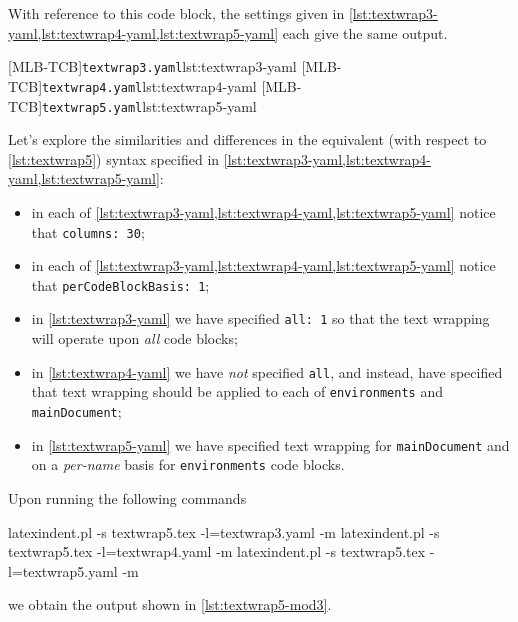 	With reference to this code block, the settings given in
	\cref{lst:textwrap3-yaml,lst:textwrap4-yaml,lst:textwrap5-yaml} each give the same
	output.

	\begin{cmhtcbraster}[raster columns=3,
			raster left skip=-3.5cm,
			raster right skip=-2cm,
			raster column skip=.03\linewidth]
		[MLB-TCB]{\texttt{textwrap3.yaml}}{lst:textwrap3-yaml}
		[MLB-TCB]{\texttt{textwrap4.yaml}}{lst:textwrap4-yaml}
		[MLB-TCB]{\texttt{textwrap5.yaml}}{lst:textwrap5-yaml}
	\end{cmhtcbraster}

	Let's explore the similarities and differences in the equivalent (with respect to
	\cref{lst:textwrap5}) syntax specified in
	\cref{lst:textwrap3-yaml,lst:textwrap4-yaml,lst:textwrap5-yaml}:
	\begin{itemize}
		\item in each of \cref{lst:textwrap3-yaml,lst:textwrap4-yaml,lst:textwrap5-yaml} notice that
		      \texttt{columns: 30};
		\item in each of \cref{lst:textwrap3-yaml,lst:textwrap4-yaml,lst:textwrap5-yaml} notice that
		      \texttt{perCodeBlockBasis: 1};
		\item in \cref{lst:textwrap3-yaml} we have specified \texttt{all: 1} so that the text wrapping
		      will operate upon \emph{all} code blocks;
		\item in \cref{lst:textwrap4-yaml} we have \emph{not} specified \texttt{all}, and instead, have
		      specified that text wrapping should be applied to each of \texttt{environments} and
		      \texttt{mainDocument};
		\item in \cref{lst:textwrap5-yaml} we have specified text wrapping for \texttt{mainDocument}
		      and on a \emph{per-name} basis for \texttt{environments} code blocks.
	\end{itemize}

	Upon running the following commands
	\begin{commandshell}
latexindent.pl -s textwrap5.tex -l=textwrap3.yaml -m
latexindent.pl -s textwrap5.tex -l=textwrap4.yaml -m
latexindent.pl -s textwrap5.tex -l=textwrap5.yaml -m
\end{commandshell}
	we obtain the output shown in \cref{lst:textwrap5-mod3}.

